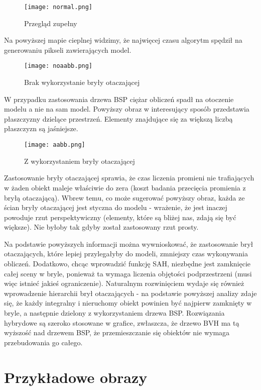 \begin{figure}[H]
\centering
  \texttt{[image: normal.png]}
  \caption{Przegląd zupełny}
\end{figure}

Na powyższej mapie cieplnej widzimy, że najwięcej czasu algorytm spędził na generowaniu pikseli zawierających model.

\begin{figure}[H]
\centering
  \texttt{[image: noaabb.png]}
  \caption{Brak wykorzystanie bryły otaczającej}
\end{figure}

W przypadku zastosowania drzewa BSP ciężar obliczeń spadł na otoczenie modelu a nie na sam model. Powyższy obraz w interesujący sposób przedstawia płaszczyzny dzielące przestrzeń. Elementy znajdujące się za większą liczbą płaszczyzn są jaśniejsze. 

\begin{figure}[H]
\centering
  \texttt{[image: aabb.png]}
  \caption{Z wykorzystaniem bryły otaczającej}
\end{figure}

Zastosowanie bryły otaczającej sprawia, że czas liczenia promieni nie trafiających w żaden obiekt maleje właściwie do zera (koszt badania przecięcia promienia z bryłą otaczającą). Wbrew temu, co może sugerować powyższy obraz, każda ze ścian bryły otaczającej jest styczna do modelu - wrażenie, że jest inaczej powoduje rzut perspektywiczny (elementy, które są bliżej nas, zdają się być większe). Nie byłoby tak gdyby został zastosowany rzut prosty.

Na podstawie powyższych informacji można wywnioskować, że zastosowanie brył otaczających, które lepiej przylegałyby do modeli, zmniejszy czas wykonywania obliczeń. Dodatkowo, chcąc wprowadzić funkcję SAH, niezbędne jest zamknięcie całej sceny w bryle, ponieważ ta wymaga liczenia objętości podprzestrzeni (musi więc istnieć jakieś ograniczenie). Naturalnym rozwinięciem wydaje się również wprowadzenie hierarchii brył otaczających - na podstawie powyższej analizy zdaje się, że każdy integralny i nieruchomy obiekt powinien być najpierw zamknięty w bryle, a następnie dzielony z wykorzystaniem drzewa BSP. Rozwiązania hybrydowe są szeroko stosowane w grafice, zwłaszcza, że drzewo BVH ma tą wyższość nad drzewem BSP, że przemieszczanie się obiektów nie wymaga przebudowania go całego.

\newpage
\section{Przykładowe obrazy}

